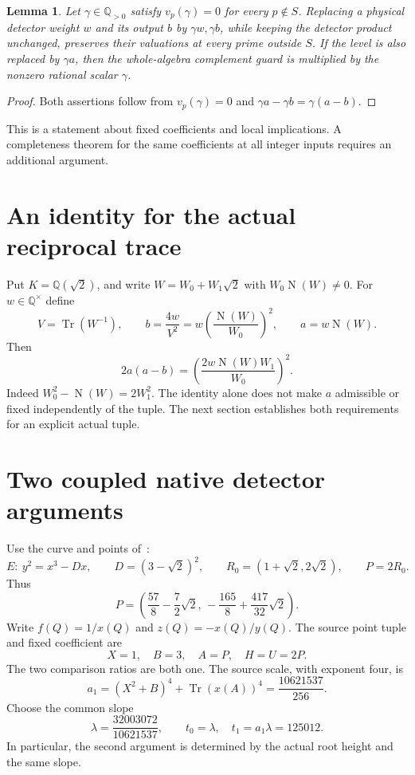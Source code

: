 \documentclass[11pt,a4paper]{article}
\newtheorem{lemma}[theorem]{Lemma}
\newcommand{\Q}{\mathbb Q}\newcommand{\Z}{\mathbb Z}
\DeclareMathOperator{\Tr}{Tr}
\DeclareMathOperator{\N}{N}
\begin{document}
\begin{lemma}\label{lem:scale}
Let $\gamma\in\Q_{>0}$ satisfy $v_p(\gamma)=0$ for every $p\notin S$.
Replacing a physical detector weight $w$ and its output $b$ by
$\gamma w,\gamma b$, while keeping the detector product unchanged,
preserves their valuations at every prime outside $S$. If the level is
also replaced by $\gamma a$, then the whole-algebra complement guard is
multiplied by the nonzero rational scalar $\gamma$.
\end{lemma}
\begin{proof}
Both assertions follow from
$v_p(\gamma)=0$ and $\gamma a-\gamma b=\gamma(a-b)$.
\end{proof}

This is a statement about fixed coefficients and local implications.
A completeness theorem for the same coefficients at all integer inputs
requires an additional argument.

\section{An identity for the actual reciprocal trace}

Put $K=\Q(\sqrt2)$, and write $W=W_0+W_1\sqrt2$ with
$W_0\N(W)\ne0$. For $w\in\Q^\times$ define
\[
 V=\Tr(W^{-1}),\qquad
 b=\frac{4w}{V^2}
   =w\left(\frac{\N(W)}{W_0}\right)^2,\qquad a=w\N(W).
\]
Then
\begin{equation}\label{eq:identity}
 2a(a-b)=
 \left(\frac{2w\N(W)W_1}{W_0}\right)^2.
\end{equation}
Indeed $W_0^2-\N(W)=2W_1^2$. The identity alone does not make $a$
admissible or fixed independently of the tuple. The next section
establishes both requirements for an explicit actual tuple.

\section{Two coupled native detector arguments}

Use the curve and points of~\cite{Direct}:
\[
 E:\ y^2=x^3-Dx,\qquad D=(3-\sqrt2)^2,\qquad
 R_0=(1+\sqrt2,2\sqrt2),\qquad P=2R_0.
\]
Thus
\[
 P=\left(\frac{57}{8}-\frac72\sqrt2,\,
          -\frac{165}{8}+\frac{417}{32}\sqrt2\right).
\]
Write $f(Q)=1/x(Q)$ and $z(Q)=-x(Q)/y(Q)$.
The source point tuple and fixed coefficient are
\begin{equation}\label{eq:tuple}
                X=1,\quad B=3,\quad A=P,\quad H=U=2P.
\end{equation}
The two comparison ratios are both one. The source scale, with exponent
four, is
\[
 a_1=(X^2+B)^4+\Tr(x(A))^4
     =\frac{10621537}{256}.
\]
Choose the common slope
\begin{equation}\label{eq:slope}
 \lambda=\frac{32003072}{10621537},\qquad
 t_0=\lambda,\quad t_1=a_1\lambda=125012.
\end{equation}
In particular, the second argument is determined by the actual root
height and the same slope.
\end{document}
